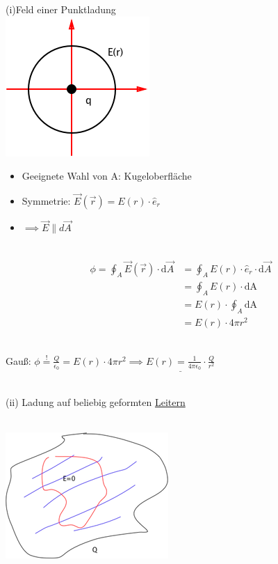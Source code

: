 \documentclass[11pt]{article}
\begin{document}
(i)Feld einer Punktladung\\
\includegraphics{skizzen/14/14_6B2}\\
\begin{itemize}
	\item Geeignete Wahl von A: Kugeloberfläche
	\item Symmetrie: $\vec{E}(\vec{r})=E(r)\cdot\hat e_r$
	\item $\implies \vec{E}\parallel d\vec{A}$
\end{itemize}

\hfill\\

\begin{align*}
	\phi=\oint_{A}\vec{E}(\vec{r})\cdot\mathrm{d}\vec{A} & = \oint_{A}E(r)\cdot\hat{e}_r\cdot\mathrm{d}\vec{A}\\
	&=\oint_{A}E(r)\cdot\mathrm{dA}\\
	&= E(r)\cdot\oint_{A}\mathrm{dA}\\
	&= E(r)\cdot4\pi r^2
\end{align*}

\hfill\\

Gauß: $\phi\overset{!}{=} \frac{Q}{\epsilon_0}=E(r)\cdot4\pi r^2 \implies \underline{E(r)=\frac{1}{4\pi\epsilon_0}\cdot\frac{Q}{r^2}}$

\hfill\\

(ii) Ladung auf beliebig geformten \underline{Leitern}

\hfill\\

\includegraphics{skizzen/14/14_6B3}
\end{document}
